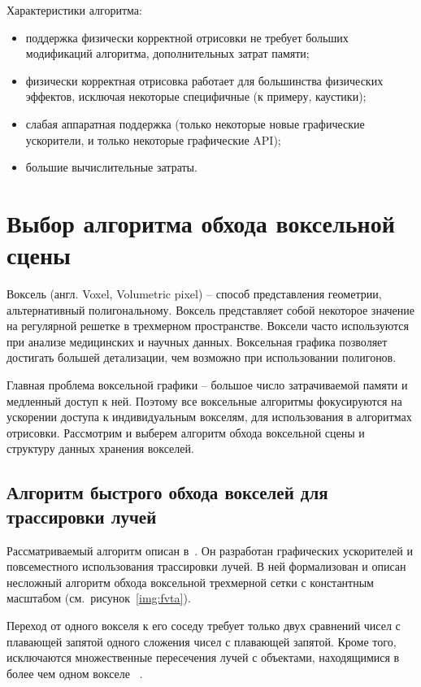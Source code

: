 
Характеристики алгоритма:
\begin{itemize}
    \item поддержка физически корректной отрисовки не требует больших модификаций алгоритма,
        дополнительных затрат памяти;
    \item физически корректная отрисовка работает для большинства физических эффектов,
        исключая некоторые специфичные (к примеру, каустики);
    \item слабая аппаратная поддержка (только некоторые новые графические ускорители, и только 
        некоторые графические API);
    \item большие вычислительные затраты.
\end{itemize}

\section{Выбор алгоритма обхода воксельной сцены}

Воксель (англ. Voxel, Volumetric pixel) -- способ представления геометрии, альтернативный
полигональному. Воксель представляет собой некоторое значение на регулярной решетке в 
трехмерном пространстве. Воксели часто используются при анализе медицинских и научных
данных. Воксельная графика позволяет достигать большей детализации,
чем возможно при использовании полигонов. 

Главная проблема воксельной графики -- большое число затрачиваемой памяти и медленный доступ к ней.
Поэтому все воксельные алгоритмы фокусируются на ускорении доступа к индивидуальным вокселям, для
использования в алгоритмах отрисовки. Рассмотрим и выберем алгоритм обхода воксельной сцены и 
структуру данных хранения вокселей.

\subsection{Алгоритм быстрого обхода вокселей для трассировки лучей}

Рассматриваемый алгоритм описан в~\cite{AFVTAfRT}. Он разработан
графических ускорителей и повсеместного использования трассировки лучей. В ней формализован 
и описан несложный алгоритм обхода воксельной трехмерной сетки с константным масштабом (см.~рисунок~\ref{img:fvta}).

Переход от одного вокселя к его соседу требует только двух сравнений чисел с плавающей запятой  
одного сложения чисел с плавающей запятой. Кроме того, исключаются множественные пересечения лучей с объектами, находящимися в более чем одном вокселе
~\cite{AFVTAfRT}.

